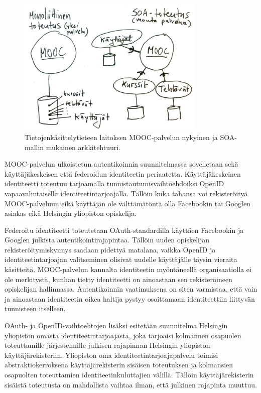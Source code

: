 \documentclass[finnish,gradu]{tktltiki}
\begin{document}
  \begin{figure}[h!]
    \centering
    \includegraphics[width=0.8\textwidth]{images/mooc-arkkitehtuuri.jpg}
    \caption{Tietojenkäsittelytieteen laitoksen MOOC-palvelun nykyinen ja SOA-mallin mukainen arkkitehtuuri.}
    \label{fig:mooc-arkkitehtuuri}
  \end{figure}

  MOOC-palvelun ulkoistetun autentikoinnin suunnitelmassa sovelletaan sekä käyttäjäkeskeisen että federoidun identiteetin periaatetta. Käyttäjäkeskeinen identiteetti toteutuu tarjoamalla tunnistautumisvaihtoehdoiksi OpenID vapaavalintaisella identiteetintarjoajalla. Tällöin kuka tahansa voi rekisteröityä MOOC-palveluun eikä käyttäjän ole välttämätöntä olla Facebookin tai Googlen asiakas eikä Helsingin yliopiston opiskelija.

  Federoitu identiteetti toteutetaan OAuth-standardilla käyttäen Facebookin ja Googlen julkista autentikointirajapintaa. Tällöin uuden opiskelijan rekisteröitymiskynnys saadaan pidettyä matalana, vaikka OpenID ja identiteetintarjoajan valitseminen olisivat uudelle käyttäjälle täysin vieraita käsitteitä. MOOC-palvelun kannalta identiteetin myöntäneellä organisaatiolla ei ole merkitystä, kunhan tietty identiteetti on ainoastaan sen rekisteröineen opiskelijan hallinnassa. Autentikoinnin vaatimuksena on siten varmistaa, että vain ja ainoastaan identiteetin oikea haltija pystyy osoittamaan identiteettiin liittyvän tunnisteen itselleen.

  OAuth- ja OpenID-vaihtoehtojen lisäksi esitetään suunnitelma Helsingin yliopiston omasta identiteetintarjoajasta, joka tarjoaisi kolmannen osapuolen toteuttamille järjestelmille julkisen rajapinnan Helsingin yliopiston käyttäjärekisteriin. Yliopiston oma identiteetintarjoajapalvelu toimisi abstraktiokerroksena käyttäjärekisterin sisäisen toteutuksen ja kolmansien osapuolten toteuttamien identiteetinkuluttajien välillä. Tällöin käyttäjärekisterin sisäistä toteutusta on mahdollista vaihtaa ilman, että julkinen rajapinta muuttuu.
\end{document}
